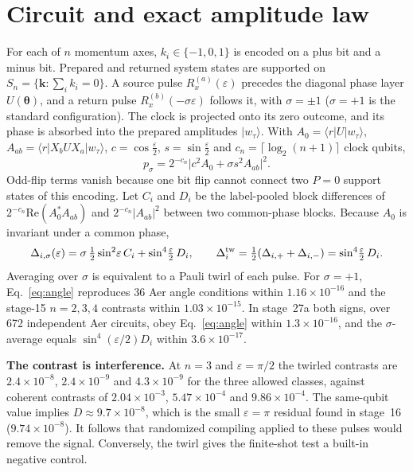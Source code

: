 \documentclass[11pt,a4paper]{article}
\begin{document}
\section*{Circuit and exact amplitude law}
For each of $n$ momentum axes, $k_i\in\{-1,0,1\}$ is encoded on a plus bit and a minus bit. Prepared and returned system states are supported on $S_n=\{\boldsymbol k:\sum_ik_i=0\}$. A source pulse $R_x^{(a)}(\varepsilon)$ precedes the diagonal phase layer $U(\boldsymbol\theta)$, and a return pulse $R_x^{(b)}(-\sigma\varepsilon)$ follows it, with $\sigma=\pm1$ ($\sigma=+1$ is the standard configuration). The clock is projected onto its zero outcome, and its phase is absorbed into the prepared amplitudes $|w_\tau\rangle$. With $A_0=\langle r|U|w_\tau\rangle$, $A_{ab}=\langle r|X_bUX_a|w_\tau\rangle$, $c=\cos\frac\varepsilon2$, $s=\sin\frac\varepsilon2$ and $c_n=\lceil\log_2(n+1)\rceil$ clock qubits,
\begin{equation}\label{eq:amp}
 p_\sigma=2^{-c_n}\bigl|c^2A_0+\sigma s^2A_{ab}\bigr|^2 .
\end{equation}
Odd-flip terms vanish because one bit flip cannot connect two $P=0$ support states of this encoding. Let $C_i$ and $D_i$ be the label-pooled block differences of $2^{-c_n}\mathrm{Re}(A_0^*A_{ab})$ and $2^{-c_n}|A_{ab}|^2$ between two common-phase blocks. Because $A_0$ is invariant under a common phase,
\begin{equation}\label{eq:angle}
 \Delta_{i,\sigma}(\varepsilon)=\sigma\,\tfrac12\sin^2\!\varepsilon\,C_i+\sin^4\!\tfrac\varepsilon2\,D_i,
 \qquad
 \Delta_i^{\rm tw}=\tfrac12(\Delta_{i,+}+\Delta_{i,-})=\sin^4\!\tfrac\varepsilon2\,D_i .
\end{equation}
Averaging over $\sigma$ is equivalent to a Pauli twirl of each pulse. For $\sigma=+1$, Eq.~\eqref{eq:angle} reproduces 36 Aer angle conditions within $1.16\times10^{-16}$ and the stage-15 $n=2,3,4$ contrasts within $1.03\times10^{-15}$. In stage~27a both signs, over 672 independent Aer circuits, obey Eq.~\eqref{eq:angle} within $1.3\times10^{-16}$, and the $\sigma$-average equals $\sin^4(\varepsilon/2)D_i$ within $3.6\times10^{-17}$.

\textbf{The contrast is interference.} At $n=3$ and $\varepsilon=\pi/2$ the twirled contrasts are $2.4\times10^{-8}$, $2.4\times10^{-9}$ and $4.3\times10^{-9}$ for the three allowed classes, against coherent contrasts of $2.04\times10^{-3}$, $5.47\times10^{-4}$ and $9.86\times10^{-4}$. The same-qubit value implies $D\approx9.7\times10^{-8}$, which is the small $\varepsilon=\pi$ residual found in stage~16 ($9.74\times10^{-8}$). It follows that randomized compiling \cite{wallman2016,hashim2021} applied to these pulses would remove the signal. Conversely, the twirl gives the finite-shot test a built-in negative control.
\end{document}
